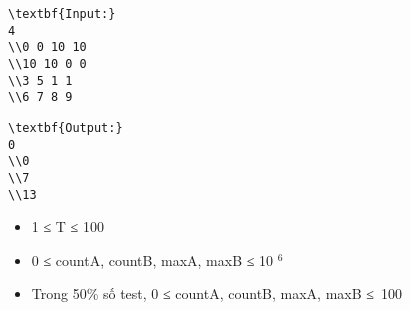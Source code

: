\begin{verbatim}
\textbf{Input:}
4
\\0 0 10 10
\\10 10 0 0
\\3 5 1 1
\\6 7 8 9 \end{verbatim}
\begin{verbatim}
\textbf{Output:}
0
\\0
\\7
\\13 \end{verbatim}
\begin{itemize}
	\item     1 ≤ T ≤ 100   
	\item     0 ≤ countA, countB, maxA, maxB ≤ 10    $^     6    $
	\item     Trong 50\% số test, 0 ≤ countA, countB, maxA, maxB ≤ 100   
\end{itemize}